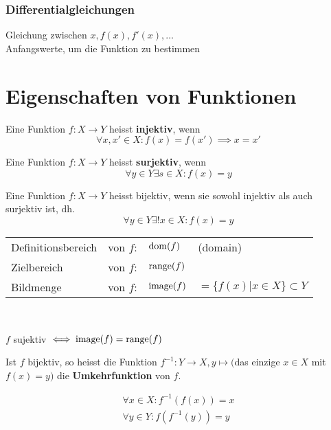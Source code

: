 \subsubsection{Differentialgleichungen}
Gleichung zwischen $x, f(x), f'(x), \dotsc$\\
Anfangswerte, um die Funktion zu bestimmen

\section{Eigenschaften von Funktionen}
\begin{def*}[note = Injektivität , index = Injektivität]
	Eine Funktion $f: X \rightarrow Y$ heisst \textbf{injektiv}, wenn\\
	\[ \forall x, x' \in X : f(x) = f(x') \implies x = x' \]
\end{def*}
\begin{def*}[note = Surjektivität , index = Surjektivität]
	Eine Funktion $f: X \rightarrow Y$ heisst \textbf{surjektiv}, wenn\\
	\[ \forall y \in Y \exists s \in X : f(x) = y \]
\end{def*}
\begin{def*}[note = Bijektivität , index = Bijektivität]
	Eine Funktion $f: X \rightarrow Y$ heisst bijektiv, wenn sie sowohl injektiv als auch surjektiv ist, dh. \\
	\[ \forall y \in Y \exists! x \in X : f(x) = y \]
\end{def*}
\begin{tabular}{l l l l}
	Definitionsbereich	&von $f$:	&$\operatorname{dom}(f)$	&(domain)					\\
	Zielbereich			&von $f$:	&$\operatorname{range}(f)$							\\
	Bildmenge			&von $f$:	&$\operatorname{image}(f)$	&$= \{ f(x) | x \in X \} \subset Y$	
\end{tabular}\\
\begin{bem}
	$f$ sujektiv $\iff \operatorname{image}(f) = \operatorname{range}(f)$
\end{bem}
\begin{def*}[note = Umkehrfunktion , index = Umkehrfunktion]
	Ist $f$ bijektiv, so heisst die Funktion $f^{-1}: Y \rightarrow X, y \mapsto ($das einzige $x \in X$ mit $f(x) = y)$ die \textbf{Umkehrfunktion} von $f$.
\end{def*}
\begin{bem}
	\begin{gather*}
		\forall x \in X : f^{-1}(f(x)) = x \\
		\forall y \in Y : f(f^{-1}(y)) = y
	\end{gather*}
\end{bem}

